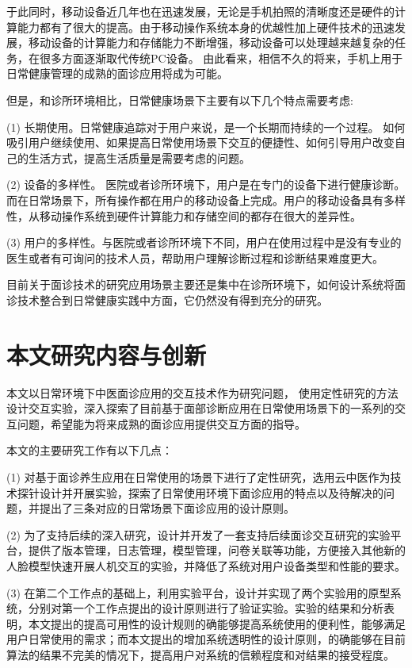 于此同时，移动设备近几年也在迅速发展，无论是手机拍照的清晰度还是硬件的计算能力都有了很大的提高。由于移动操作系统本身的优越性加上硬件技术的迅速发展，移动设备的计算能力和存储能力不断增强，移动设备可以处理越来越复杂的任务，在很多方面逐渐取代传统PC设备。
由此看来，相信不久的将来，手机上用于日常健康管理的成熟的面诊应用将成为可能。

但是，和诊所环境相比，日常健康场景下主要有以下几个特点需要考虑: 

(1) 长期使用。日常健康追踪对于用户来说，是一个长期而持续的一个过程。 如何吸引用户继续使用、如果提高日常使用场景下交互的便捷性、如何引导用户改变自己的生活方式，提高生活质量是需要考虑的问题。

(2) 设备的多样性。 医院或者诊所环境下，用户是在专门的设备下进行健康诊断。而在日常场景下，所有操作都在用户的移动设备上完成。用户的移动设备具有多样性，从移动操作系统到硬件计算能力和存储空间的都存在很大的差异性。

(3) 用户的多样性。与医院或者诊所环境下不同，用户在使用过程中是没有专业的医生或者有可询问的技术人员，帮助用户理解诊断过程和诊断结果难度更大。

目前关于面诊技术的研究应用场景主要还是集中在诊所环境下，如何设计系统将面诊技术整合到日常健康实践中方面，它仍然没有得到充分的研究。



\section{本文研究内容与创新}

本文以日常环境下中医面诊应用的交互技术作为研究问题，
使用定性研究的方法设计交互实验，深入探索了目前基于面部诊断应用在日常使用场景下的一系列的交互问题，希望能为将来成熟的面诊应用提供交互方面的指导。

本文的主要研究工作有以下几点：

(1) 对基于面诊养生应用在日常使用的场景下进行了定性研究，选用云中医作为技术探针设计并开展实验，探索了日常使用环境下面诊应用的特点以及待解决的问题，并提出了三条对应的日常场景下面诊应用的设计原则。

(2) 为了支持后续的深入研究，设计并开发了一套支持后续面诊交互研究的实验平台，提供了版本管理，日志管理，模型管理，问卷关联等功能，方便接入其他新的人脸模型快速开展人机交互的实验，并降低了系统对用户设备类型和性能的要求。

(3) 在第二个工作点的基础上，利用实验平台，设计并实现了两个实验用的原型系统，分别对第一个工作点提出的设计原则进行了验证实验。实验的结果和分析表明，本文提出的提高可用性的设计规则的确能够提高系统使用的便利性，能够满足用户日常使用的需求；而本文提出的增加系统透明性的设计原则，的确能够在目前算法的结果不完美的情况下，提高用户对系统的信赖程度和对结果的接受程度。


